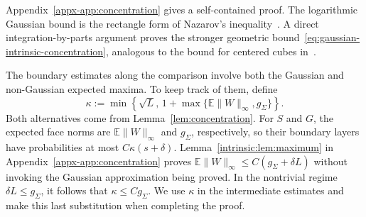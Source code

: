 \documentclass[11pt,letterpaper]{article}
\newenvironment{vSixBlock}{\color{magenta}}{}
\theoremstyle{remark}
\newcommand{\E}{\mathbb E}
\begin{document}
{
Appendix~\ref{appx-app:concentration} gives a self-contained proof.
The logarithmic Gaussian bound is the rectangle form of Nazarov's
inequality~\cite[Lemma~A.1]{CCK2017}. A direct integration-by-parts
argument proves the stronger geometric
bound~\eqref{eq:gaussian-intrinsic-concentration}, analogous to the
bound for centered cubes in~\cite[Theorem~3 and Comment~5]{CCK2015AC}.
}

\begin{vSixBlock}
The boundary estimates along the comparison involve both the Gaussian
and non-Gaussian expected maxima. To keep track of them, define
\begin{equation}\label{eq:intrinsic-boundary-coefficient}
 \kappa:=\min\left\{\sqrt L,\,
             1+\max\{\E\|W\|_\infty,g_\Sigma\}\right\}.
\end{equation}
Both alternatives come from Lemma~\ref{lem:concentration}.
For \(S\) and \(G\), the expected face norms are
\(\E\|W\|_\infty\) and \(g_\Sigma\), respectively, so their
boundary layers have probabilities at most \(C\kappa(s+\delta)\).
Lemma~\ref{intrinsic:lem:maximum} in
Appendix~\ref{appx-app:concentration} proves
\(\E\|W\|_\infty\le C(g_\Sigma+\delta L)\) without invoking
the Gaussian approximation being proved. In the nontrivial regime
\(\delta L\le g_\Sigma\), it follows that \(\kappa\le Cg_\Sigma\).
We use \(\kappa\) in the intermediate estimates and make this last
substitution when completing the proof.
\end{vSixBlock}
\end{document}
